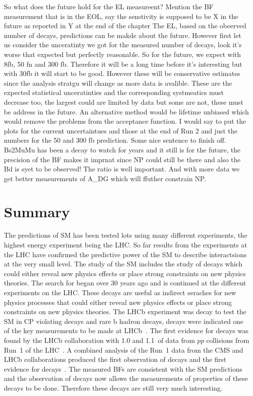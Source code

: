 So what does the future hold for the EL measureent? 
Mention the BF measurement that is in the EOL, say the senstivity is supposed to be X in the future as reported in Y at the end of the chapter
The EL, based on the obeerved number of decays, predictions can be makde about the future. However first let us consider the unceratinty we got for the measured number of decays, look it's worse that expected but perfectly reasonable. So for the future, we expect with 8fb, 50 fn and 300 fb. Therefore it will be a long time before it's interesting but with 30fb it will start to be good. However these will be conservative estimates since the analysis stratgu will change as more data is avalible. These are the expected statistical unceratinties and the corresponding systmeatics must decrease too, the largest could are limited by data but some are not, these must be address in the future. An alternative method would be lifetime unbiased which would remove the problems from the acceptance function. 
I would say to put the plots for the current uncertaintues and those at the end of Run 2 and just the numbers for the 50 and 300 fb prediction.
Some nice sentence to finish off. Bs2MuMu has been a decay to watch for years and it still is for the future, the precision of the BF makes it imprnat since NP could still be there and also the Bd is syet to be observed! The ratio is well important. And with more data we get better measurements of A_DG which will ffuther constrain NP.


\section{Summary}
The predictions of SM has been tested lots using many different experiments, the highest energy experiment being the LHC. So far results from the experiments at the LHC have confirmed the predictive power of the SM to describe interactsions at the very small level. The study of the SM includes the study of \bmumu decays which could either reveal new physics effects or place strong constraints on new physics theories.
The search for \bsmumu began over 30 years ago and is continued at the different experiments on the LHC. These decays are useful as indirect seraches for new physics processes that could either reveal new physics effects or place strong constraints on new physics theories. 
The LHCb experiment was decay to test the SM in CP violating decays and rare b hadron decays, \bmumu decays were indicated one of the key measurements to be made at LHCb~\cite{Adeva:2009ny}.
The first evidence for \bsmumu decays was found by the LHCb collaboration with 1.0 and 1.1~\fb of data from $pp$ collisions from Run~1 of the LHC~\cite{Aaji:2012nna}. A combined analysis of the Run~1 data from the CMS and LHCb collaborations produced the first observation of \bsmumu decays and the first evidence for \bdmumu decays~\cite{CMS:2014xfa}. The measured BFs are consistent with the SM predictions and the observation of \bsmumu decays now allows the measurements of properties of these decays to be done. Therefore these decays are still very much interesting. 

